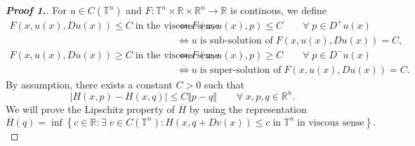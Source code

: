 \documentclass[12pt, oneside]{amsart}  	%
\begin{document}
\begin{proof}[\textbf{Proof 1.}] For $u\in C(\mathbb{T}^n)$ and $F:\mathbb{T}^n\times \mathbb{R}\times \mathbb{R}^n\longrightarrow \mathbb{R}$ is continous, we define
\begin{align*}
F(x,u(x),Du(x)) \leq C\;\text{in the viscous sense}\; &\Longleftrightarrow F(x,u(x),p) \leq C \qquad\forall\; p\in D^+u(x)\\
&\Longleftrightarrow u\;\text{is sub-solution of}\; F(x,u(x),Du(x)) = C,\\
F(x,u(x),Du(x)) \geq C\;\text{in the viscous sense}\; &\Longleftrightarrow F(x,u(x),p) \geq C \qquad\forall\; p\in D^-u(x)\\
&\Longleftrightarrow u\;\text{is super-solution of}\; F(x,u(x),Du(x)) = C.
\end{align*}
By assumption, there exists a constant $C>0$ such that
\begin{equation*}
|H(x,p) - H(x,q)|\leq C\Vert p-q\Vert\qquad\forall\;x,p,q\in \mathbb{R}^n.
\end{equation*}
We will prove the Lipschitz property of $\overline{H}$ by using the representation 
\begin{equation}\label{nonconvex - representation of effective H}
\overline{H}(q) = \inf \left\lbrace c\in \mathbb{R}: \exists\;v\in C(\mathbb{T}^n): H(x,q+Dv(x))\leq c\;\text{in}\;\mathbb{T}^n\;\text{in viscous sense}\right\rbrace .
\end{equation}
\vspace*{0.2cm}

\end{proof}
\end{document}
